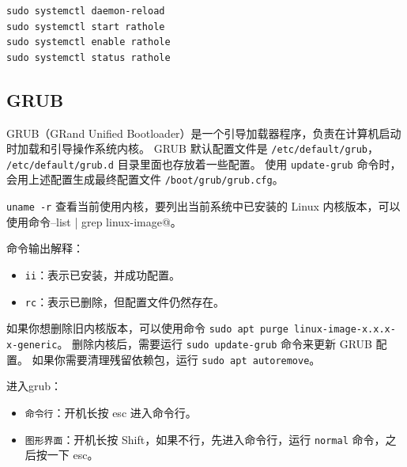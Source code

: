 \begin{code}[title=cron 任务格式]
	\begin{verbatim}
sudo systemctl daemon-reload
sudo systemctl start rathole
sudo systemctl enable rathole
sudo systemctl status rathole
    \end{verbatim}
\end{code}

\subsection{GRUB}
GRUB（GRand Unified Bootloader）是一个引导加载器程序，负责在计算机启动时加载和引导操作系统内核。
GRUB 默认配置文件是 \texttt{/etc/default/grub}， \texttt{/etc/default/grub.d} 目录里面也存放着一些配置。
使用 \verb|update-grub| 命令时，会用上述配置生成最终配置文件 \texttt{/boot/grub/grub.cfg}。

\verb|uname -r| 查看当前使用内核，要列出当前系统中已安装的 Linux 内核版本，可以使用命令\verb@dpkg --list | grep linux-image@。

命令输出解释：
\begin{itemize}
	\item \texttt{ii}：表示已安装，并成功配置。
	\item \texttt{rc}：表示已删除，但配置文件仍然存在。
\end{itemize}

如果你想删除旧内核版本，可以使用命令 \verb|sudo apt purge linux-image-x.x.x-x-generic|。
删除内核后，需要运行 \verb|sudo update-grub| 命令来更新 GRUB 配置。
如果你需要清理残留依赖包，运行 \verb|sudo apt autoremove|。

进入grub：
\begin{itemize}
	\item \texttt{命令行}：开机长按 esc 进入命令行。
	\item \texttt{图形界面}：开机长按 Shift，如果不行，先进入命令行，运行 \verb|normal| 命令，之后按一下 esc。
\end{itemize}
